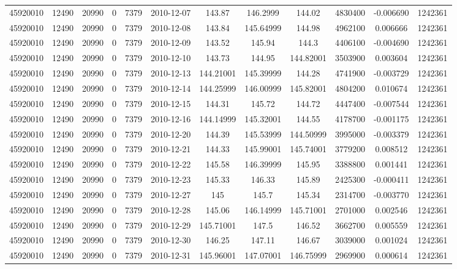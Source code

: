 \documentclass[12 pt]{article}
\begin{document}
\begin{flushleft}
\begin{table}[h]
\begin{tabular}{c c c c c c c c c c c c }
45920010 & 12490 & 20990 & 0 & 7379 & 2010-12-07 & 143.87 & 146.2999 & 144.02 & 4830400 & -0.006690 & 1242361\\
45920010 & 12490 & 20990 & 0 & 7379 & 2010-12-08 & 143.84 & 145.64999 & 144.98 & 4962100 & 0.006666 & 1242361\\
45920010 & 12490 & 20990 & 0 & 7379 & 2010-12-09 & 143.52 & 145.94 & 144.3 & 4406100 & -0.004690 & 1242361\\
45920010 & 12490 & 20990 & 0 & 7379 & 2010-12-10 & 143.73 & 144.95 & 144.82001 & 3503900 & 0.003604 & 1242361\\
45920010 & 12490 & 20990 & 0 & 7379 & 2010-12-13 & 144.21001 & 145.39999 & 144.28 & 4741900 & -0.003729 & 1242361\\
45920010 & 12490 & 20990 & 0 & 7379 & 2010-12-14 & 144.25999 & 146.00999 & 145.82001 & 4804200 & 0.010674 & 1242361\\
45920010 & 12490 & 20990 & 0 & 7379 & 2010-12-15 & 144.31 & 145.72 & 144.72 & 4447400 & -0.007544 & 1242361\\
45920010 & 12490 & 20990 & 0 & 7379 & 2010-12-16 & 144.14999 & 145.32001 & 144.55 & 4178700 & -0.001175 & 1242361\\
45920010 & 12490 & 20990 & 0 & 7379 & 2010-12-20 & 144.39 & 145.53999 & 144.50999 & 3995000 & -0.003379 & 1242361\\
45920010 & 12490 & 20990 & 0 & 7379 & 2010-12-21 & 144.33 & 145.99001 & 145.74001 & 3779200 & 0.008512 & 1242361\\
45920010 & 12490 & 20990 & 0 & 7379 & 2010-12-22 & 145.58 & 146.39999 & 145.95 & 3388800 & 0.001441 & 1242361\\
45920010 & 12490 & 20990 & 0 & 7379 & 2010-12-23 & 145.33 & 146.33 & 145.89 & 2425300 & -0.000411 & 1242361\\
45920010 & 12490 & 20990 & 0 & 7379 & 2010-12-27 & 145 & 145.7 & 145.34 & 2314700 & -0.003770 & 1242361\\
45920010 & 12490 & 20990 & 0 & 7379 & 2010-12-28 & 145.06 & 146.14999 & 145.71001 & 2701000 & 0.002546 & 1242361\\
45920010 & 12490 & 20990 & 0 & 7379 & 2010-12-29 & 145.71001 & 147.5 & 146.52 & 3662700 & 0.005559 & 1242361\\
45920010 & 12490 & 20990 & 0 & 7379 & 2010-12-30 & 146.25 & 147.11 & 146.67 & 3039000 & 0.001024 & 1242361\\
45920010 & 12490 & 20990 & 0 & 7379 & 2010-12-31 & 145.96001 & 147.07001 & 146.75999 & 2969900 & 0.000614 & 1242361\\
\end{tabular} 
 \end{table} \begin{verbatim} 


\end{verbatim}
\end{flushleft}
\end{document}

